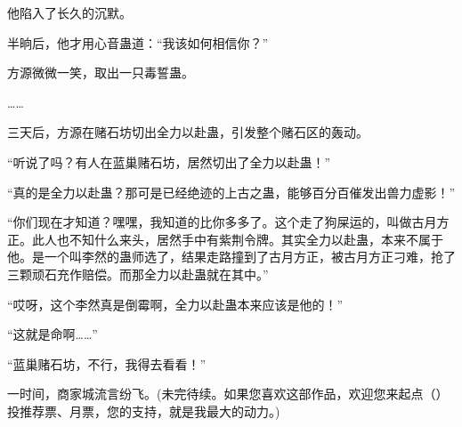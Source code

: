 \begin{this_body}
他陷入了长久的沉默。

半晌后，他才用心音蛊道：“我该如何相信你？”

方源微微一笑，取出一只毒誓蛊。

……

三天后，方源在赌石坊切出全力以赴蛊，引发整个赌石区的轰动。

“听说了吗？有人在蓝巢赌石坊，居然切出了全力以赴蛊！”

“真的是全力以赴蛊？那可是已经绝迹的上古之蛊，能够百分百催发出兽力虚影！”

“你们现在才知道？嘿嘿，我知道的比你多多了。这个走了狗屎运的，叫做古月方正。此人也不知什么来头，居然手中有紫荆令牌。其实全力以赴蛊，本来不属于他。是一个叫李然的蛊师选了，结果走路撞到了古月方正，被古月方正刁难，抢了三颗顽石充作赔偿。而那全力以赴蛊就在其中。”

“哎呀，这个李然真是倒霉啊，全力以赴蛊本来应该是他的！”

“这就是命啊……”

“蓝巢赌石坊，不行，我得去看看！”

一时间，商家城流言纷飞。(未完待续。如果您喜欢这部作品，欢迎您来起点（）投推荐票、月票，您的支持，就是我最大的动力。)

\end{this_body}

